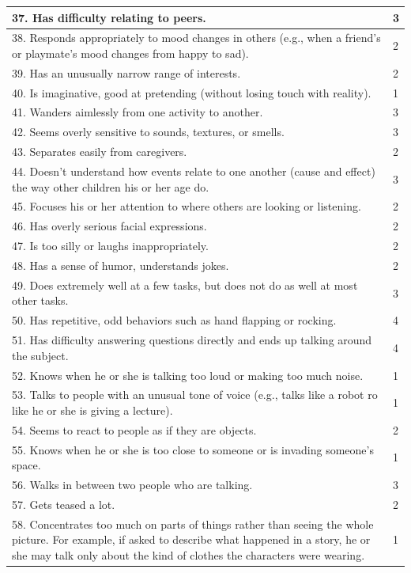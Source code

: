\documentclass{ut-thesis}
\begin{document}
\begin{appendices}
\begin{longtable}{ | p{13cm} | l | }
	37. Has difficulty relating to peers.	&	3	\\	\hline
	38. Responds appropriately to mood changes in others (e.g., when a friend's or playmate's mood changes from happy to sad).	&	2	\\	\hline
	39. Has an unusually narrow range of interests.	&	2	\\	\hline
	40. Is imaginative, good at pretending (without losing touch with reality).	&	1	\\	\hline
	41. Wanders aimlessly from one activity to another.	&	3	\\	\hline
	42. Seems overly sensitive to sounds, textures, or smells.	&	3	\\	\hline
	43. Separates easily from caregivers.	&	2	\\	\hline
	44. Doesn't understand how events relate to one another (cause and effect) the way other children his or her age do.	&	3	\\	\hline
	45. Focuses his or her attention to where others are looking or listening.	&	2	\\	\hline
	46. Has overly serious facial expressions.	&	2	\\	\hline
	47. Is too silly or laughs inappropriately.	&	2	\\	\hline
	48. Has a sense of humor, understands jokes.	&	2	\\	\hline
	49. Does extremely well at a few tasks, but does not do as well at most other tasks.	&	3	\\	\hline
	50. Has repetitive, odd behaviors such as hand flapping or rocking.	&	4	\\	\hline
	51. Has difficulty answering questions directly and ends up talking around the subject.	&	4	\\	\hline
	52. Knows when he or she is talking too loud or making too much noise.	&	1	\\	\hline
	53. Talks to people with an unusual tone of voice (e.g., talks like a robot ro like he or she is giving a lecture).	&	1	\\	\hline
	54. Seems to react to people as if they are objects.	&	2	\\	\hline
	55. Knows when he or she is too close to someone or is invading someone's space.	&	1	\\	\hline
	56. Walks in between two people who are talking.	&	3	\\	\hline
	57. Gets teased a lot.	&	2	\\	\hline
	58. Concentrates too much on parts of things rather than seeing the whole picture.  For example, if asked to describe what happened in a story, he or she may talk only about the kind of clothes the characters were wearing.	&	1	\\	\hline

\end{longtable}
\end{appendices}
\end{document}
